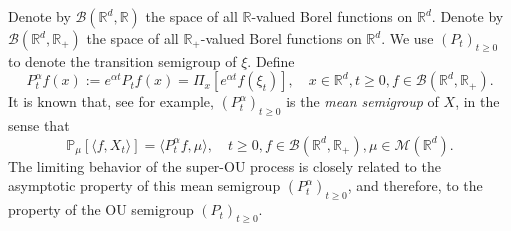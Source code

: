 \documentclass[12pt,a4paper]{amsart}
\theoremstyle{plain}
\theoremstyle{definition}
\numberwithin{equation}{section}
\begin{document}
    Denote by $\mathcal B(\mathbb R^d, \mathbb R)$ the space of all $\mathbb R$-valued Borel functions on $\mathbb R^d$.
    Denote by $\mathcal B(\mathbb R^d, \mathbb R_+)$ the space of all $\mathbb R_+$-valued Borel functions on $\mathbb R^d$.
    We use  $(P_t)_{t\geq 0}$ to denote the transition semigroup of $\xi$.	
    Define
\begin{equation}
\label{eq: meansemigroup}
    P^{\alpha}_t f(x)
    :=
    e^{\alpha t} P_t f(x) =
    \Pi_x [e^{\alpha t}f(\xi_t)],
    \quad x\in \mathbb R^d,t\geq 0, f\in \mathcal B(\mathbb R^d, \mathbb R_+).
\end{equation}
    It is known that, see \cite[Proposition 2.27]{Li2011Measure-valued} for example, $(P^\alpha_t)_{t\geq 0}$ is the \emph{mean semigroup} of $X$, in the sense that
\begin{equation}
    \mathbb{P}_{\mu}[\langle f, X_t \rangle]
    = \langle P^\alpha_t f, \mu \rangle,
    \quad t\geq 0, f\in \mathcal B(\mathbb R^d, \mathbb R_+), \mu \in \mathcal M(\mathbb R^d).
\end{equation}
        The limiting behavior of the super-OU process is closely related to the asymptotic property of this mean semigroup $(P^\alpha_t)_{t\geq 0}$, and therefore, to the property of the OU semigroup $(P_t)_{t\geq 0}$.
\end{document}
